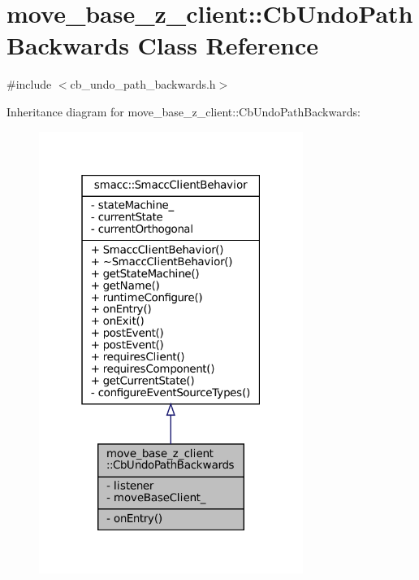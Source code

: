 \hypertarget{classmove__base__z__client_1_1CbUndoPathBackwards}{}\section{move\+\_\+base\+\_\+z\+\_\+client\+:\+:Cb\+Undo\+Path\+Backwards Class Reference}
\label{classmove__base__z__client_1_1CbUndoPathBackwards}


{\ttfamily \#include $<$cb\+\_\+undo\+\_\+path\+\_\+backwards.\+h$>$}



Inheritance diagram for move\+\_\+base\+\_\+z\+\_\+client\+:\+:Cb\+Undo\+Path\+Backwards\+:
\nopagebreak
\begin{figure}[H]
\begin{center}
\leavevmode
\includegraphics[width=244pt]{classmove__base__z__client_1_1CbUndoPathBackwards__inherit__graph}
\end{center}
\end{figure}


